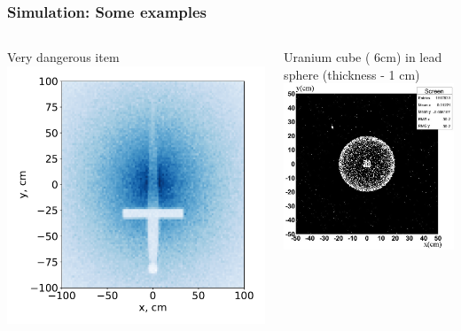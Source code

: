 \documentclass[11pt]{beamer}
\begin{document}
\begin{frame}
    \frametitle{Simulation: Some examples}
    \begin{columns}
        \begin{column}{0.5\textwidth}
            Very dangerous item\\
            \includegraphics[width=1\textwidth]{figures/Sword.pdf}
        \end{column}
        \begin{column}{0.5\textwidth}
            Uranium cube ( 6cm) in lead sphere (thickness - 1 cm)\\
            \includegraphics[width=1\textwidth]{figures/sim_cube_in_orb.jpeg}
        \end{column}
    \end{columns}  
\end{frame}
\end{document}
